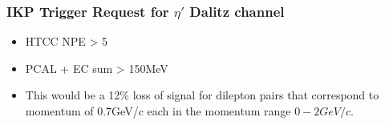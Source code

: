 \documentclass[xcolor=table, xcolor=dvipsnames]{beamer}
\begin{document}
\begin{frame}
	\frametitle{IKP Trigger Request for $\eta'$ Dalitz channel}
	\begin{itemize}
		\item HTCC NPE > 5
       	\item PCAL + EC sum > 150MeV

       	\item This would be a 12\% loss of signal for dilepton pairs that correspond to momentum of 0.7GeV/c each in the momentum range $0-2GeV/c$.
    \end{itemize}
\end{frame}
      
      
             
         
         
 
\end{document}
